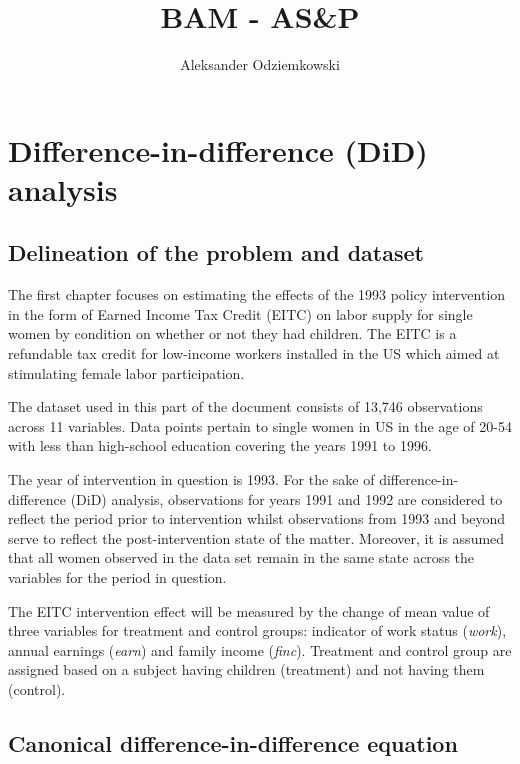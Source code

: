 \documentclass{article}
\title{BAM - AS\&P}
\author{Aleksander Odziemkowski}
\begin{document}
\maketitle

\begin{abstract}
\centering
\end{abstract}

\section{Difference-in-difference (DiD) analysis}

\subsection{Delineation of the problem and dataset}

The first chapter focuses on estimating the effects of the 1993 policy intervention in the form of Earned Income Tax Credit (EITC) on labor supply for single women by condition on whether or not they had children. The EITC is a refundable
tax credit for low-income workers installed in the US which aimed at stimulating female labor participation.

The dataset used in this part of the document consists of 13,746 observations across 11 variables. Data points pertain to single women in US in the age of 20-54 with less than high-school education covering the years 1991 to 1996.

The year of intervention in question is 1993. For the sake of difference-in-difference (DiD) analysis, observations for years 1991 and 1992 are considered to reflect the period prior to intervention whilst observations from 1993 and beyond serve to reflect the post-intervention state of the matter. Moreover, it is assumed that all women observed in the data set remain in the same state across the variables for the period in question. 

The EITC intervention effect will be measured by the change of mean value of three variables for treatment and control groups: indicator of work status (\emph{work}), annual earnings (\emph{earn}) and family income (\emph{finc}). Treatment and control group are assigned based on a subject having children (treatment) and not having them (control).

\subsection{Canonical difference-in-difference equation}
\label{canonical}
\end{document}
